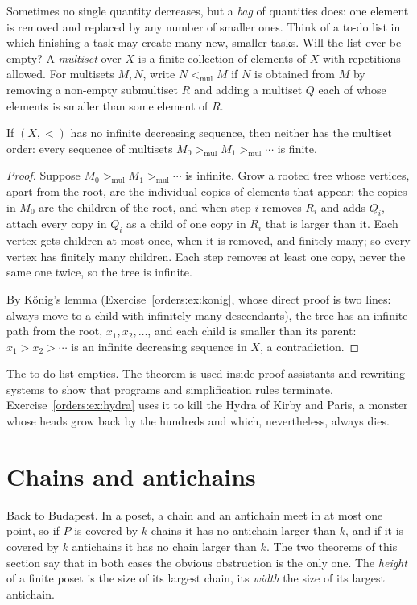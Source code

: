 Sometimes no single quantity decreases, but a \emph{bag} of quantities does: one element is removed and replaced by any
number of smaller ones. Think of a to-do list in which finishing a task may create many new, smaller tasks. Will the list
ever be empty? A \emph{multiset} over $X$ is a finite collection of elements of $X$ with repetitions allowed. For multisets $M,N$, write
$N<_{\mathrm{mul}}M$ if $N$ is obtained from $M$ by removing a non-empty submultiset $R$ and adding a multiset $Q$ each of whose elements is
smaller than some element of $R$.

\begin{theorem}\label{orders:thm:multiset}
If $(X,<)$ has no infinite decreasing sequence, then neither has the multiset order: every sequence of multisets
$M_0>_{\mathrm{mul}}M_1>_{\mathrm{mul}}\cdots$ is finite.
\end{theorem}
\begin{proof}
Suppose $M_0>_{\mathrm{mul}}M_1>_{\mathrm{mul}}\cdots$ is infinite. Grow a rooted tree whose vertices, apart from the root, are the individual copies of
elements that appear: the copies in $M_0$ are the children of the root, and when step $i$ removes $R_i$ and adds $Q_i$, attach every
copy in $Q_i$ as a child of one copy in $R_i$ that is larger than it. Each vertex gets children at most once, when it is
removed, and finitely many; so every vertex has finitely many children. Each step removes at least one copy, never
the same one twice, so the tree is infinite.

By K\H onig's lemma (Exercise~\ref{orders:ex:konig}, whose direct proof is two lines: always move to a child with infinitely many
descendants), the tree has an infinite path from the root, $x_1,x_2,\dots$, and each child is smaller than its parent:
$x_1>x_2>\cdots$ is an infinite decreasing sequence in $X$, a contradiction.
\end{proof}

The to-do list empties. The theorem is used inside proof assistants and rewriting systems to show that programs and
simplification rules terminate. Exercise~\ref{orders:ex:hydra} uses it to kill the Hydra of Kirby and Paris, a monster whose
heads grow back by the hundreds and which, nevertheless, always dies.

\section{Chains and antichains}

Back to Budapest. In a poset, a chain and an antichain meet in at most one point, so if $P$ is covered by $k$ chains it has
no antichain larger than $k$, and if it is covered by $k$ antichains it has no chain larger than $k$. The two theorems of this
section say that in both cases the obvious obstruction is the only one. The \emph{height} of a finite poset is the size of
its largest chain, its \emph{width} the size of its largest antichain.

